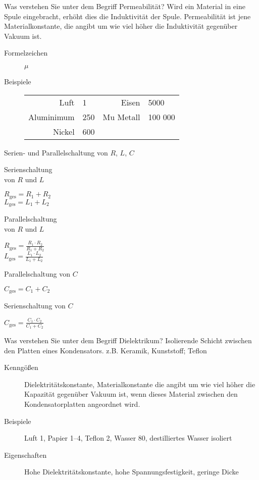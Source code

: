 \documentclass[avery5371,grid,frame,a4paper]{flashcards}
\newcommand{\card}[3]{
  \begin{flashcard}[{\chap} -- #1]{#2}#3\end{flashcard}
}
\begin{document}
\card{10}{Was verstehen Sie unter dem Begriff Permeabilität?}{
  Wird ein Material in eine Spule eingebracht, erhöht dies die Induktivität der Spule.
  Permeabilität ist jene Materialkonstante, die angibt um wie viel höher die Induktivität
  gegenüber Vakuum ist.
  \begin{description}
    \item[Formelzeichen] $\mu$
    \item[Beispiele]
      \begin{tabular}{rlrl}
        Luft       & 1      & Eisen      & 5000 \\
        Aluminimum & 250    & Mu Metall  & 100 000 \\
        Nickel     & 600    &            & \\
      \end{tabular}
  \end{description}
}

\card{11}{Serien- und Parallelschaltung von $R$, $L$, $C$}{
  \begin{minipage}{0.5\textwidth}
    \centering
    Serienschaltung \\ von $R$ und $L$
    \begin{center}
      $ R_{\text{ges}} = R_1 + R_2 $ \\
      $ L_{\text{ges}} = L_1 + L_2 $
    \end{center}
    Parallelschaltung \\ von $R$ und $L$
    \begin{center}
      $ {R_{\text{ges}}} = \frac{R_1 \cdot R_2}{R_1 + R_2} $ \\
      $ {L_{\text{ges}}} = \frac{L_1 \cdot L_2}{L_1 + L_2} $
    \end{center}
  \end{minipage}
  \begin{minipage}{0.49\textwidth}
    \centering
    Parallelschaltung von $C$
    \begin{center}
      $ C_{\text{ges}} = C_1 + C_2 $
    \end{center}
    Serienschaltung von $C$
    \begin{center}
      $ {C_{\text{ges}}} = \frac{C_1 \cdot C_2}{C_1 + C_2} $
    \end{center}
  \end{minipage}
}


\card{12}{Was verstehen Sie unter dem Begriff Dielektrikum?}{
  Isolierende Schicht zwischen den Platten eines Kondensators. z.B. Keramik, Kunststoff; Teflon
  {\small
    \begin{description}
      \item[Kenngößen]
        Dielektritätskonstante, Materialkonstante die angibt um wie viel höher die Kapazität gegenüber Vakuum ist, wenn dieses Material zwischen den Kondensatorplatten angeordnet wird.
      \item[Beispiele] Luft 1, Papier 1--4, Teflon 2, Wasser 80, destilliertes Wasser isoliert
      \item[Eigenschaften] Hohe Dielektritätskonstante, hohe Spannungsfestigkeit, geringe Dicke
    \end{description}
  }
}
\end{document}
